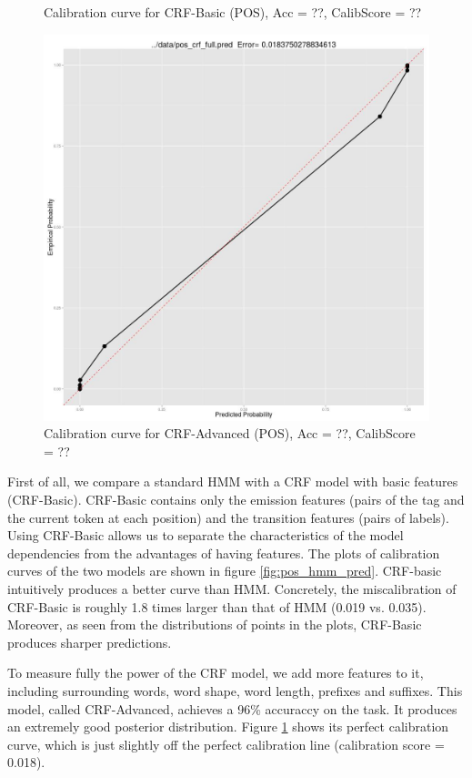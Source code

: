 \begin{figure}[t]
  \caption{Calibration curve for CRF-Basic (POS), Acc = ??, CalibScore = ??}
  \label{fig:pos_crf_pred}
\endminipage\hfill
{}
  \includegraphics[width=\linewidth]{pos_crf_advanced_pred.jpg}
  \caption{Calibration curve for CRF-Advanced (POS), Acc = ??, CalibScore = ??}
  \label{fig:pos_crf_advanced_pred}  
\endminipage
\end{figure}

First of all, we compare a standard HMM with a CRF model with basic features (CRF-Basic). CRF-Basic contains only the emission features (pairs of the tag and the current token at each position) and the transition features (pairs of labels). Using CRF-Basic allows us to separate the characteristics of the model dependencies from the advantages of having features. The plots of calibration curves of the two models are shown in figure \ref{fig:pos_hmm_pred}. CRF-basic intuitively produces a better curve than HMM. Concretely, the miscalibration of CRF-Basic is roughly 1.8 times larger than that of HMM (0.019 vs. 0.035). Moreover, as seen from the distributions of points in the plots, CRF-Basic produces sharper predictions.

To measure fully the power of the CRF model, we add more features to it, including surrounding words, word shape, word length, prefixes and suffixes. This model, called CRF-Advanced, achieves a 96\% accuraccy on the task. It produces an extremely good posterior distribution. Figure \ref{fig:pos_crf_advanced_pred} shows its perfect calibration curve, which is just slightly off the perfect calibration line (calibration score = 0.018). 


